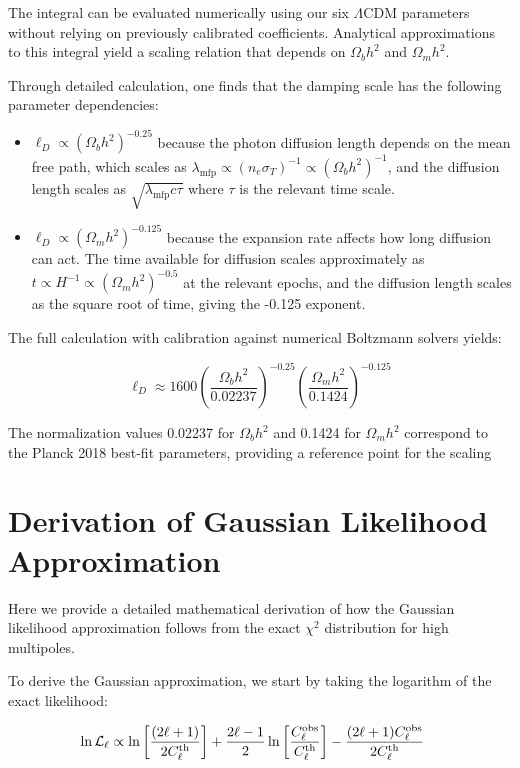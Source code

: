 \documentclass[11pt]{article}
\theoremstyle{definition}
\begin{document}
The integral can be evaluated numerically using our six $\Lambda$CDM parameters without relying on previously calibrated coefficients. Analytical approximations to this integral yield a scaling relation that depends on $\Omega_b h^2$ and $\Omega_m h^2$.

Through detailed calculation, one finds that the damping scale has the following parameter dependencies:
\begin{itemize}
\item $\ell_D \propto (\Omega_b h^2)^{-0.25}$ because the photon diffusion length depends on the mean free path, which scales as $\lambda_{\text{mfp}} \propto (n_e \sigma_T)^{-1} \propto (\Omega_b h^2)^{-1}$, and the diffusion length scales as $\sqrt{\lambda_{\text{mfp}}c\tau}$ where $\tau$ is the relevant time scale.

\item $\ell_D \propto (\Omega_m h^2)^{-0.125}$ because the expansion rate affects how long diffusion can act. The time available for diffusion scales approximately as $t \propto H^{-1} \propto (\Omega_m h^2)^{-0.5}$ at the relevant epochs, and the diffusion length scales as the square root of time, giving the -0.125 exponent.
\end{itemize}

The full calculation with calibration against numerical Boltzmann solvers yields:

\begin{equation}
\ell_D \approx 1600 \left(\frac{\Omega_b h^2}{0.02237}\right)^{-0.25} \left(\frac{\Omega_m h^2}{0.1424}\right)^{-0.125}
\end{equation}

The normalization values 0.02237 for $\Omega_b h^2$ and 0.1424 for $\Omega_m h^2$ correspond to the Planck 2018 best-fit parameters, providing a reference point for the scaling

\section{Derivation of Gaussian Likelihood Approximation}
\label{app:gaussian}

Here we provide a detailed mathematical derivation of how the Gaussian likelihood approximation follows from the exact $\chi^2$ distribution for high multipoles.

To derive the Gaussian approximation, we start by taking the logarithm of the exact likelihood:

\begin{align}
\ln\mathcal{L}_\ell &\propto \ln\left[\frac{(2\ell+1)}{2C_\ell^{\rm th}}\right] + \frac{2\ell-1}{2}\ln\left[\frac{C_\ell^{\rm obs}}{C_\ell^{\rm th}}\right] - \frac{(2\ell+1)C_\ell^{\rm obs}}{2C_\ell^{\rm th}}
\end{align}
\end{document}
